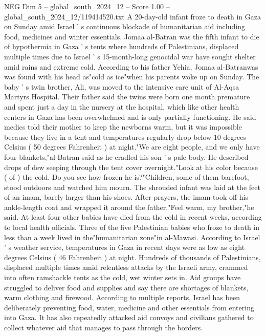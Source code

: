 \begin{textsample}{NEG Dim 5 – global\_south\_2024\_12 – Score 1.00 – global\_south\_2024\_12/119414520.txt}  \label{ex:f5_neg_405}
A 20-day-old infant froze to death in Gaza on Sunday amid Israel ' s continuous blockade of humanitarian aid including food, medicines and winter essentials.
Jomaa al-Batran was the fifth infant to die of hypothermia in Gaza ' s tents where hundreds of Palestinians, displaced multiple times due to Israel ' s 15-month-long genocidal war have sought shelter amid rains and extreme cold.
According to his father Yehia, Jomaa al-Batranwas was found with his head as"cold as ice"when his parents woke up on Sunday.
The baby ' s twin brother, Ali, was moved to the intensive care unit of Al-Aqsa Martyrs Hospital.
Their father said the twins were born one month premature and spent just a day in the nursery at the hospital, which like other health centers in Gaza has been overwhelmed and is only partially functioning.
He said medics told their mother to keep the newborns warm, but it was impossible because they live in a tent and temperatures regularly drop below 10 degrees Celsius ( 50 degrees Fahrenheit ) at night."We are eight people, and we only have four blankets,"al-Batran said as he cradled his son ' s pale body.
He described drops of dew seeping through the tent cover overnight."Look at his color because ( of ) the cold.
Do you see how frozen he is?"Children, some of them barefoot, stood outdoors and watched him mourn.
The shrouded infant was laid at the feet of an imam, barely larger than his shoes.
After prayers, the imam took off his ankle-length coat and wrapped it around the father."Feel warm, my brother,"he said.
At least four other babies have died from the cold in recent weeks, according to local health officials.
Three of the five Palestinian babies who froze to death in less than a week lived in the"humanitarian zone"in al-Mawasi.
According to Israel ' s weather service, temperatures in Gaza in recent days were as low as eight degrees Celsius ( 46 Fahrenheit ) at night.
Hundreds of thousands of Palestinians, displaced multiple times amid relentless attacks by the Israeli army, crammed into often ramshackle tents as the cold, wet winter sets in.
Aid groups have struggled to deliver food and supplies and say there are shortages of blankets, warm clothing and firewood.
According to multiple reports, Israel has been deliberately preventing food, water, medicine and other essentials from entering into Gaza.
It has also repeatedly attacked aid convoys and civilians gathered to collect whatever aid that manages to pass through the borders.

\end{textsample}

